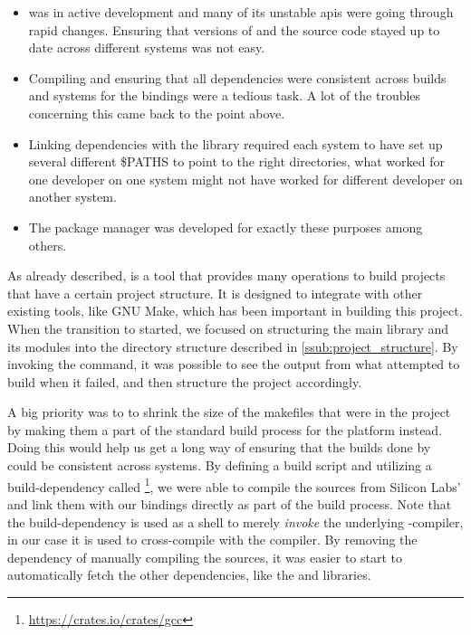 \begin{itemize}
    \item {\rust} was in active development and many of its unstable \glspl{api} were going through rapid changes.
    Ensuring that versions of {\rustc} and the {\rust} source code stayed up to date across different systems was not easy.
    \item Compiling and ensuring that all dependencies were consistent across builds and systems for the bindings were a tedious task.
    A lot of the troubles concerning this came back to the point above.
    \item Linking dependencies with the library required each system to have set up several different \$PATHS to point to the right directories, what worked for one developer on one system might not have worked for different developer on another system.
    \item The {\cargo} package manager was developed for exactly these purposes among others.
\end{itemize}

As already described, {\cargo} is a tool that provides many operations to build {\rust} projects that have a certain project structure.
It is designed to integrate with other existing tools, like GNU Make, which has been important in  building this project.
When the transition to {\cargo} started, we focused on structuring the main library and its modules into the directory structure described in \autoref{ssub:project_structure}.
By invoking the  command, it was possible to see the output from what {\cargo} attempted to build when it failed, and then structure the project accordingly.

A big priority was to to shrink the size of the makefiles that were in the project by making them a part of the standard build process for the {\rg} platform instead.
Doing this would help us get a long way of ensuring that the builds done by {\cargo} could be consistent across systems.
By defining a {\rust} build script and utilizing a {\rust} build-dependency called \footnote{\url{https://crates.io/crates/gcc}}, we were able to compile the {\C} sources from Silicon Labs' {\emlib} and link them with our bindings directly as part of the build process.
Note that the  build-dependency is used as a shell to merely \emph{invoke} the underlying {\C}-compiler, in our case it is used to cross-compile with the {\armgcc} compiler.
By removing the dependency of manually compiling the {\C} sources, it was easier to start to automatically fetch the other dependencies, like the {\core} and  libraries.


